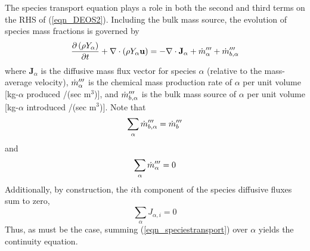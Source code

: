 \documentclass[11pt]{book}
\begin{document}
The species transport equation plays a role in both the second and third terms on the RHS of (\ref{eqn_DEOS2}).  Including the bulk mass source, the evolution of species mass fractions is governed by
\begin{equation}
\label{eqn_speciestransport}
\frac{\partial \left(\rho Y_\alpha\right)}{\partial t} + \nabla\cdot \left(\rho Y_\alpha \mathbf{u}\right)  = - \nabla\cdot \mathbf{J}_{\alpha} + \dot{m}_\alpha^{{\prime\prime\prime}} + \dot{m}_{b,\alpha}^{{\prime\prime\prime}}
\end{equation}
where $\mathbf{J}_{\alpha}$ is the diffusive mass flux vector for species $\alpha$ (relative to the mass-average velocity),
$\dot{m}_\alpha^{{\prime\prime\prime}}$ is the chemical mass production rate of $\alpha$ per unit volume [kg-$\alpha$ produced /(sec m$^3$)],
and $\dot{m}_{b,\alpha}^{{\prime\prime\prime}}$ is the bulk mass source of $\alpha$ per unit volume [kg-$\alpha$ introduced /(sec m$^3$)].  Note that
\begin{equation}
\label{eqn_bulksum}
\sum_\alpha \dot{m}_{b,\alpha}^{{\prime\prime\prime}} = \dot{m}_b^{{\prime\prime\prime}}
\end{equation}
and
\begin{equation}
\label{eqn_massconservation}
\sum_\alpha \dot{m}_\alpha^{{\prime\prime\prime}} = 0
\end{equation}
Additionally, by construction, the $i$th component of the species diffusive fluxes sum to zero,
\begin{equation}
\label{eqn_sumdiffflux}
\sum_\alpha J_{\alpha,i} = 0
\end{equation}
Thus, as must be the case, summing (\ref{eqn_speciestransport}) over $\alpha$ yields the continuity equation.
\end{document}
